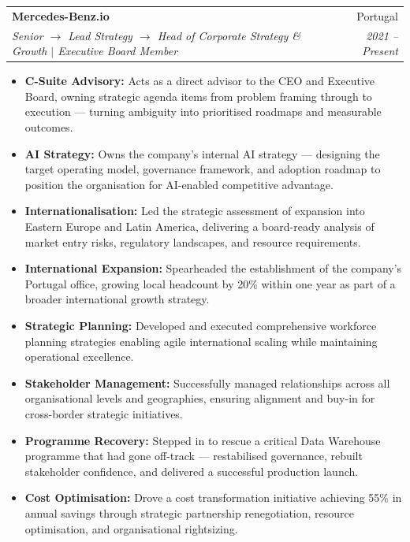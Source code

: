 \documentclass[a4paper,10pt]{article}
\makeatletter
\newcommand{\resumeItem}[1]{
  \item\small{
    {#1 \vspace{-2pt}}
  }
}
\newcommand{\resumeSubheading}[4]{
  \vspace{-2pt}\item
    \begin{tabular*}{0.97\textwidth}[t]{l@{\extracolsep{\fill}}r}
      \textbf{#1} & #2 \\
      \textit{\small#3} & \textit{\small #4} \\
    \end{tabular*}\vspace{-3pt}
}
\newcommand{\resumeItemListStart}{\begin{itemize}[leftmargin=0.2in, itemsep=1pt, parsep=0pt, topsep=2pt]}
\newcommand{\resumeItemListEnd}{\end{itemize}\vspace{-4pt}}
\makeatother
\begin{document}
    \resumeSubheading
      {Mercedes-Benz.io}{Portugal}
      {Senior $\rightarrow$ Lead Strategy $\rightarrow$ Head of Corporate Strategy \& Growth $|$ Executive Board Member}{2021 -- Present}
      \resumeItemListStart
        \resumeItem{\textbf{C-Suite Advisory:} Acts as a direct advisor to the CEO and Executive Board, owning strategic agenda items from problem framing through to execution — turning ambiguity into prioritised roadmaps and measurable outcomes.}
        \resumeItem{\textbf{AI Strategy:} Owns the company's internal AI strategy — designing the target operating model, governance framework, and adoption roadmap to position the organisation for AI-enabled competitive advantage.}
        \resumeItem{\textbf{Internationalisation:} Led the strategic assessment of expansion into Eastern Europe and Latin America, delivering a board-ready analysis of market entry risks, regulatory landscapes, and resource requirements.}
        \resumeItem{\textbf{International Expansion:} Spearheaded the establishment of the company's Portugal office, growing local headcount by 20\% within one year as part of a broader international growth strategy.}
        \resumeItem{\textbf{Strategic Planning:} Developed and executed comprehensive workforce planning strategies enabling agile international scaling while maintaining operational excellence.}
        \resumeItem{\textbf{Stakeholder Management:} Successfully managed relationships across all organisational levels and geographies, ensuring alignment and buy-in for cross-border strategic initiatives.}
        \resumeItem{\textbf{Programme Recovery:} Stepped in to rescue a critical Data Warehouse programme that had gone off-track — restabilised governance, rebuilt stakeholder confidence, and delivered a successful production launch.}
        \resumeItem{\textbf{Cost Optimisation:} Drove a cost transformation initiative achieving 55\% in annual savings through strategic partnership renegotiation, resource optimisation, and organisational rightsizing.}
      \resumeItemListEnd
\end{document}

